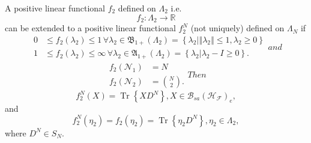 \documentclass[aps,preprint]{revtex4}%
\begin{document}
A positive linear functional $f_{2}$ defined on $\Lambda_{2}$ i.e.
\begin{equation}
f_{2}:\Lambda_{2}\rightarrow\mathbb{R}%
\end{equation}
can be extended to a positive linear functional $f_{2}^{N}$ (not uniquely)
defined on $\Lambda_{N}$ if
\begin{subequations}
\label{SORDcon}%
\begin{align}
0  &  \leq f_{2}\left(  \lambda_{2}\right)  \leq1\,\forall\lambda_{2}%
\in\mathfrak{B}_{1+}\left(  \Lambda_{2}\right)  =\left\{  \left.  \lambda
_{2}\right\vert \left\Vert \lambda_{2}\right\Vert \leq1,\lambda_{2}%
\geq0\right\} \label{con2.1}\\
1  &  \leq f_{2}\left(  \lambda_{2}\right)  \leq\infty\,\forall\lambda_{2}%
\in\mathfrak{A}_{1+}\left(  \Lambda_{2}\right)  =\left\{  \left.  \lambda
_{2}\right\vert \lambda_{2}-I\geq0\right\}  . \label{con2.2}%
\end{align}
and
\end{subequations}
\begin{subequations}
\label{NumCon}%
\begin{align}
f_{2}\left(  \mathcal{N}_{1}\right)   &  =N\\
f_{2}\left(  \mathcal{N}_{2}\right)   &  =\binom{N}{2}.
\end{align}
Then%
\end{subequations}
\begin{equation}
f_{2}^{N}\left(  X\right)  =\operatorname*{Tr}\left\{  XD^{N}\right\}
,X\in\mathcal{B}_{sa}\left(  \mathcal{H}_{\mathcal{F}}\right)  _{e},
\end{equation}
and
\begin{equation}
f_{2}^{N}\left(  \eta_{2}\right)  =f_{2}\left(  \eta_{2}\right)
=\operatorname*{Tr}\left\{  \eta_{2}D^{N}\right\}  ,\eta_{2}\in\Lambda_{2},
\end{equation}
where $D^{N}\in S_{N}.$
\end{document}
